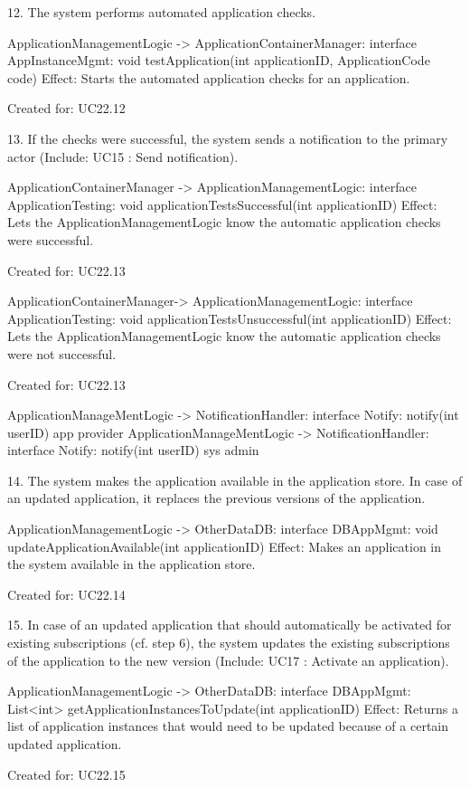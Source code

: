         12. The system performs automated application checks.

            ApplicationManagementLogic -> ApplicationContainerManager: interface AppInstanceMgmt: void testApplication(int applicationID, ApplicationCode code)
                Effect: Starts the automated application checks for an application.
                \item Created for: UC22.12

        13. If the checks were successful, the system sends a notification to the primary actor (Include: UC15 : Send notification).

            ApplicationContainerManager -> ApplicationManagementLogic: interface ApplicationTesting: void applicationTestsSuccessful(int applicationID)
                Effect: Lets the ApplicationManagementLogic know the automatic application checks were successful.
                \item Created for: UC22.13

            ApplicationContainerManager-> ApplicationManagementLogic: interface ApplicationTesting: void applicationTestsUnsuccessful(int applicationID)
                Effect: Lets the ApplicationManagementLogic know the automatic application checks were not successful.
                \item Created for: UC22.13

            ApplicationManageMentLogic -> NotificationHandler: interface Notify: notify(int userID) app provider
            ApplicationManageMentLogic -> NotificationHandler: interface Notify: notify(int userID) sys admin

        14. The system makes the application available in the application store. In case of an updated application, it replaces the previous versions of the application.

            ApplicationManagementLogic -> OtherDataDB: interface DBAppMgmt: void updateApplicationAvailable(int applicationID)
                Effect: Makes an application in the system available in the application store.
                \item Created for: UC22.14

        15. In case of an updated application that should automatically be activated for existing subscriptions (cf. step 6),
            the system updates the existing subscriptions of the application to the new version (Include: UC17 : Activate an application).

            ApplicationManagementLogic -> OtherDataDB: interface DBAppMgmt: List<int> getApplicationInstancesToUpdate(int applicationID)
                Effect: Returns a list of application instances that would need to be updated because of a certain updated application.
                \item Created for: UC22.15

